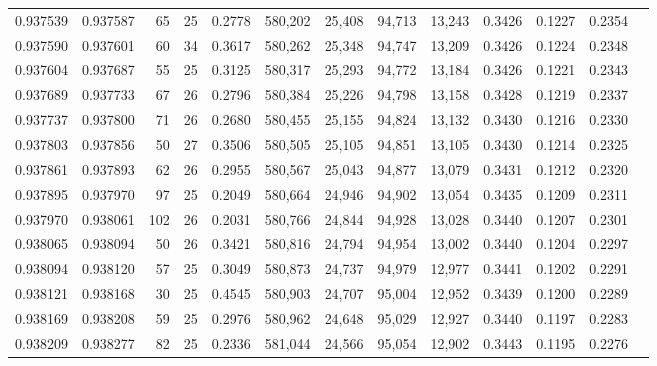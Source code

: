 \begin{tabular}{rrrrrrrrrrrrr}
0.937539 & 0.937587 &    65 &  25 &                                     0.2778 & 580,202 &  25,408 &  94,713 &  13,243 & 0.3426 & 0.1227 & 0.2354 \\
0.937590 & 0.937601 &    60 &  34 &                                     0.3617 & 580,262 &  25,348 &  94,747 &  13,209 & 0.3426 & 0.1224 & 0.2348 \\
0.937604 & 0.937687 &    55 &  25 &                                     0.3125 & 580,317 &  25,293 &  94,772 &  13,184 & 0.3426 & 0.1221 & 0.2343 \\
0.937689 & 0.937733 &    67 &  26 &                                     0.2796 & 580,384 &  25,226 &  94,798 &  13,158 & 0.3428 & 0.1219 & 0.2337 \\
0.937737 & 0.937800 &    71 &  26 &                                     0.2680 & 580,455 &  25,155 &  94,824 &  13,132 & 0.3430 & 0.1216 & 0.2330 \\
0.937803 & 0.937856 &    50 &  27 &                                     0.3506 & 580,505 &  25,105 &  94,851 &  13,105 & 0.3430 & 0.1214 & 0.2325 \\
0.937861 & 0.937893 &    62 &  26 &                                     0.2955 & 580,567 &  25,043 &  94,877 &  13,079 & 0.3431 & 0.1212 & 0.2320 \\
0.937895 & 0.937970 &    97 &  25 &                                     0.2049 & 580,664 &  24,946 &  94,902 &  13,054 & 0.3435 & 0.1209 & 0.2311 \\
0.937970 & 0.938061 &   102 &  26 &                                     0.2031 & 580,766 &  24,844 &  94,928 &  13,028 & 0.3440 & 0.1207 & 0.2301 \\
0.938065 & 0.938094 &    50 &  26 &                                     0.3421 & 580,816 &  24,794 &  94,954 &  13,002 & 0.3440 & 0.1204 & 0.2297 \\
0.938094 & 0.938120 &    57 &  25 &                                     0.3049 & 580,873 &  24,737 &  94,979 &  12,977 & 0.3441 & 0.1202 & 0.2291 \\
0.938121 & 0.938168 &    30 &  25 &                                     0.4545 & 580,903 &  24,707 &  95,004 &  12,952 & 0.3439 & 0.1200 & 0.2289 \\
0.938169 & 0.938208 &    59 &  25 &                                     0.2976 & 580,962 &  24,648 &  95,029 &  12,927 & 0.3440 & 0.1197 & 0.2283 \\
0.938209 & 0.938277 &    82 &  25 &                                     0.2336 & 581,044 &  24,566 &  95,054 &  12,902 & 0.3443 & 0.1195 & 0.2276 \\

\end{tabular}
